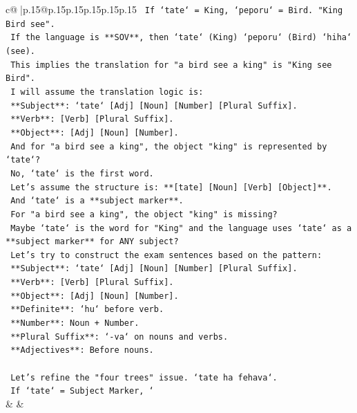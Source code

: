 \documentclass{article}
\begin{document}
{\begin{supertabular}{c@{$\;$}|p{.15\linewidth}@{}p{.15\linewidth}p{.15\linewidth}p{.15\linewidth}p{.15\linewidth}p{.15\linewidth}}
{{{\texttt{    If `tate` = King, `peporu` = Bird. "King Bird see".} \\
\texttt{    If the language is **SOV**, then `tate` (King) `peporu` (Bird) `hiha` (see).} \\
\texttt{    This implies the translation for "a bird see a king" is "King see Bird".} \\
\texttt{    I will assume the translation logic is:} \\
\texttt{    **Subject**: `tate` {[}Adj{]} {[}Noun{]} {[}Number{]} {[}Plural Suffix{]}.} \\
\texttt{    **Verb**: {[}Verb{]} {[}Plural Suffix{]}.} \\
\texttt{    **Object**: {[}Adj{]} {[}Noun{]} {[}Number{]}.} \\
\texttt{    And for "a bird see a king", the object "king" is represented by `tate`?} \\
\texttt{    No, `tate` is the first word.} \\
\texttt{    Let's assume the structure is: **{[}tate{]} {[}Noun{]} {[}Verb{]} {[}Object{]}**.} \\
\texttt{    And `tate` is a **subject marker**.} \\
\texttt{    For "a bird see a king", the object "king" is missing?} \\
\texttt{    Maybe `tate` is the word for "King" and the language uses `tate` as a **subject marker** for ANY subject?} \\
\texttt{    Let's try to construct the exam sentences based on the pattern:} \\
\texttt{    **Subject**: `tate` {[}Adj{]} {[}Noun{]} {[}Number{]} {[}Plural Suffix{]}.} \\
\texttt{    **Verb**: {[}Verb{]} {[}Plural Suffix{]}.} \\
\texttt{    **Object**: {[}Adj{]} {[}Noun{]} {[}Number{]}.} \\
\texttt{    **Definite**: `hu` before verb.} \\
\texttt{    **Number**: Noun + Number.} \\
\texttt{    **Plural Suffix**: `{-}va` on nouns and verbs.} \\
\texttt{    **Adjectives**: Before nouns.} \\
\\ 
\texttt{    Let's refine the "four trees" issue. `tate ha fehava`.} \\
\texttt{    If `tate` = Subject Marker, `} \\
            }
        }
    }
    & & \\ \\


\end{supertabular}}
\end{document}
